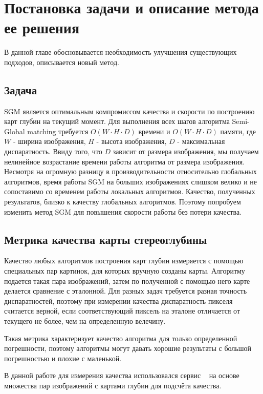 \chapter{Постановка задачи и описание метода ее решения} 
\label{chapter2}

В данной главе обосновывается необходимость улучшения существующих подходов, описывается новый метод.

\section{Задача}
SGM является оптимальным компромиссом качества и скорости по построению карт глубин на текущий момент. Для выполнения всех шагов алгоритма Semi-Global matching требуется $ O ( W \cdot H \cdot D) $ времени и $ O ( W \cdot H \cdot  D) $ памяти, где $W$ - ширина изображения, $H$ - высота изображения, $D$ - максимальная диспаратность. Ввиду того, что $D$ зависит от размера изображения, мы получаем нелинейное возрастание времени работы алгоритма от размера изображения. Несмотря на огромную разницу в производительности относительно глобальных алгоритмов, время работы SGM на больших изображениях слишком велико и не сопоставимо со временем работы локальных алгоритмов. Качество, полученных результатов, близко к качеству глобальных алгоритмов. Поэтому попробуем изменить метод SGM для повышения скорости работы без потери качества.


\section{Метрика качества карты стереоглубины}

Качество любых алгоритмов построения карт глубин измеряется с помощью специальных пар картинок, для которых вручную созданы карты. Алгоритму подается такая пара изображений, затем по полученной с помощью него карте делается сравнение с эталонной.  Для разных задач требуется разная точность диспаратностей, поэтому при измерении качества диспаратность пикселя считается верной, если соответствующий пиксель на эталоне отличается от текущего не более, чем на определенную велечину. 

Такая метрика характеризует качество алгоритма для только определенной погрешности, поэтому алгоритмы могут давать хорошие результаты с большой погрешностью и плохие с маленькой. 

В данной работе для измерения качества использовался сервис ~\cite{middlebury} на основе множества пар изображений с картами глубин для подсчёта качества.

